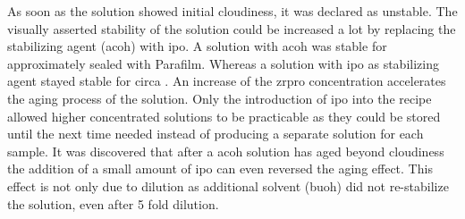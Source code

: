 As soon as the solution showed initial cloudiness, it was declared as unstable. 
The visually asserted stability of the solution could be increased a lot by replacing the stabilizing agent (\gls{acoh}) with \gls{ipo}.
A solution with \gls{acoh} was stable for approximately  sealed with Parafilm. 
Whereas a solution with \gls{ipo} as stabilizing agent stayed stable for circa . 
An increase of the \gls{zrpro} concentration accelerates the aging process of the solution.
%
Only the introduction of \gls{ipo} into the recipe allowed higher concentrated solutions to be practicable 
as they could be stored until the next time needed instead of producing a separate solution for each sample.
It was discovered that after a \gls{acoh} solution has aged beyond cloudiness 
the addition of a small amount of \gls{ipo} can even reversed the aging effect. %
This effect is not only due to dilution as additional solvent (\gls{buoh}) did not re-stabilize the solution, 
even after 5 fold dilution. 

